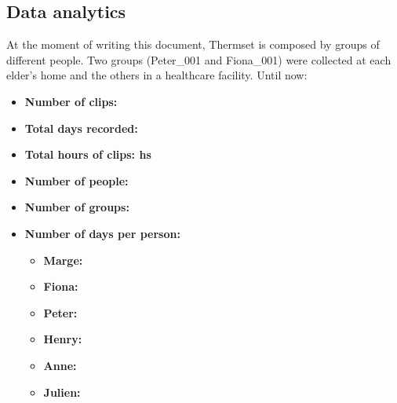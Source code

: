 \documentclass[oneside, twocolumn]{article}
\begin{document}
\subsection{Data analytics}
At the moment of writing this document, Thermset is composed by \NumberOfGroups{} groups of \NumberOfPeople{} different people.
Two groups (Peter\_001 and Fiona\_001) were collected at each elder's home and the others in a
healthcare facility. Until now:

\begin{itemize}
	\item \textbf{Number of clips: \NumberOfClips{}}
  \item \textbf{Total days recorded: \TotalNumberOfDays{}}
  \item \textbf{Total hours of clips: \TotalHoursOfRecording{} hs}
  \item \textbf{Number of people: \NumberOfPeople{}}
  \item \textbf{Number of groups: \NumberOfGroups{}}

  \item \textbf{Number of days per person:}
  \begin{itemize}
    \item \textbf{Marge: \MargeDays{}}
    \item \textbf{Fiona: \FionaDays{}}
    \item \textbf{Peter: \PeterDays{}}
    \iffalse
    \item \textbf{Henry: \HenryDays{}}
    \item \textbf{Anne: \AnneDays{}}
    \item \textbf{Julien: \JulienDays{}}

\end{itemize}
\end{itemize}
\end{document}
